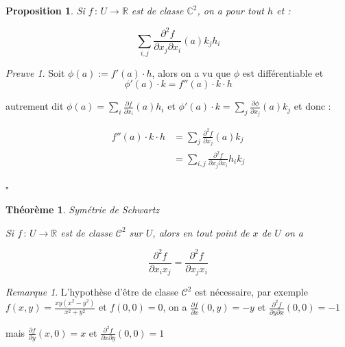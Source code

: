 \documentclass[]{article}
\newtheorem{mythm}{Théorème}
\newtheorem{myproposition}{Proposition}
\theoremstyle{remark}
\newtheorem{myrem}{Remarque}
\newtheorem{myproof}{Preuve}
\theoremstyle{definition}
\newcommand{\cqfd}{
	\hfill$\square$
}
\newcommand{\funcshort}[3]{
#1 \, : \, #2 \longrightarrow #3
}
\begin{document}
\begin{myproposition}
	Si $\funcshort{f}{U}{\mathbb{R}}$ est de classe $\mathbb{C}^2$, on a pour tout $h$ et :
	
	$$\sum_{i, j} \frac{\partial^2 f}{\partial x_j \partial x_i}(a) k_j h_i$$
\end{myproposition}

\begin{myproof}
	Soit $\phi(a) := f'(a) \cdot h$, alors on a vu que $\phi$ est différentiable et $$\phi'(a) \cdot k = f''(a) \cdot k \cdot h$$
	
	autrement dit $\phi(a) = \sum_i \frac{\partial f}{\partial x_i}(a) h_i$ et $\phi'(a) \cdot k = \sum_j \frac{\partial \phi}{\partial x_j}(a)k_j$ et donc :
	
	$$
	\begin{aligned}
		f''(a) \cdot k \cdot h &= \sum_j \frac{\partial^2 f}{\partial x_j}(a) k_j \\
		&=\sum_{i, j} \frac{\partial^2 f}{\partial x_j \partial x_i} h_i k_j
	\end{aligned}
	$$
	\cqfd
\end{myproof}

\begin{mythm}Symétrie de Schwartz
	
	Si $\funcshort{f}{U}{\mathbb{R}}$ est de classe $\mathcal{C}^2$ sur $U$, alors en tout point de $x$ de $U$ on a
	
	$$\frac{\partial^2 f}{\partial x_i x_j} = \frac{\partial^2 f}{\partial x_j x_i}$$
\end{mythm}

\begin{myrem}
	L'hypothèse d'être de classe $\mathcal{C^2}$ est nécessaire, par exemple $f(x, y) = \frac{xy(x^2 - y^2)}{x^2 + y^2}$ et $f(0, 0) = 0$, on a $\displaystyle \frac{\partial f}{\partial x}(0, y) = -y$ et $\displaystyle \frac{\partial^2 f}{\partial y \partial x}(0, 0) = -1$
	
	mais $\displaystyle \frac{\partial f}{\partial y}(x, 0) = x$ et $\displaystyle \frac{\partial^2 f}{\partial x \partial y}(0, 0) = 1$
\end{myrem}
\end{document}
